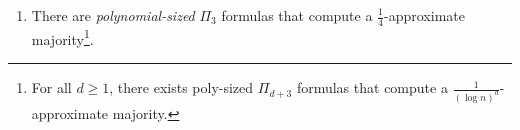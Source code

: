 \documentclass[11pt]{article}
\newcommand\vv[1]{\mathbf{#1}}
\begin{document}
\begin{enumerate}
\begin{proof}
Next condition on $E_2$ and let $p = \frac{1}{2} + \delta$. Using a similar argument, we have 
\begin{align*}
	\Pr\left[F_{\pi}(\vv{x}) = 1\middle|E_2\right] &= \Pr\left[t(r_1, ..., r_c) = 1\middle|E_2\right]\\
	&= \left(\Pr\left[r_i(d_{i,1}, ..., d_{i,b}) = 1| \middle|E_2\right]\right)^c\\
	&= \left(1 - \Pr\left[r_i(d_{i,1}, ..., d_{i,b}) = 0\middle|E_2\right]\right)^c\\
	&= \left(1 - \left(1 - \Pr\left[d_{i,j}(\pi(y_{i,j,1}), ..., \pi(y_{i,j,a})) = 1\middle|E_2\right]\right)^b\right)^c\\
	&\geq \left(1 - \left(1 - \left(\frac{1}{2} + \delta\right)^a\right)^b\right)^c\\
	&> 1 - 2^n
\end{align*}
so $\Pr[A] \geq 1 - 2^{-n}$ as required. Taking a union bound over all $2^n$ inputs, we see that there must exist some projection $\pi$ for which $F_{\pi}(\vv{x})$ is a $\delta$-approximate majority. Return the $\Pi_3$ formula obtained by hard-wiring $\pi$ into $F$.
\end{proof}

\item There are \emph{polynomial-sized} $\Pi_3$ formulas that compute a $\frac{1}{4}$-approximate majority\footnote{For all $d \geq 1$, there exists poly-sized $\Pi_{d+3}$ formulas that compute a $\frac{1}{(\log n)^d}$-approximate majority.}.


\end{enumerate}
\end{document}
